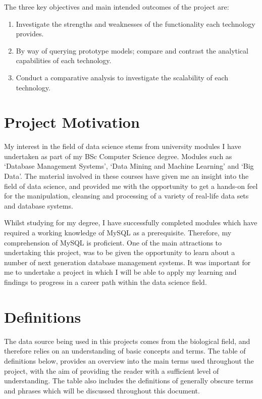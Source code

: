 The three key objectives and main intended outcomes of the project are:
\begin{enumerate}
\item Investigate the strengths and weaknesses of the functionality each technology provides.
\item By way of querying prototype models; compare and contrast the analytical capabilities of each technology.
\item Conduct a comparative analysis to investigate the scalability of each technology.
\end{enumerate}

\section{Project Motivation}
My interest in the field of data science stems from university modules I have undertaken as part of my BSc Computer Science degree. Modules such as `Database Management Systems', `Data Mining and Machine Learning' and `Big Data'. The material involved in these courses have given me an insight into the field of data science, and provided me with the opportunity to get a hands-on feel for the manipulation, cleansing and processing of a variety of real-life data sets and database systems.

Whilst studying for my degree, I have successfully completed modules which have required a working knowledge of MySQL as a prerequisite. Therefore, my comprehension of MySQL is proficient. One of the main attractions to undertaking this project, was to be given the opportunity to learn about a number of next generation database management systems. It was important for me to undertake a project in which I will be able to apply my learning and findings to progress in a career path within the data science field.

\section{Definitions}
The data source being used in this projects comes from the biological field, and therefore relies on an understanding of basic concepts and terms. The table of definitions below, provides an overview into the main terms used throughout the project, with the aim of providing the reader with a sufficient level of understanding. The table also includes the definitions of generally obscure terms and phrases which will be discussed throughout this document.

